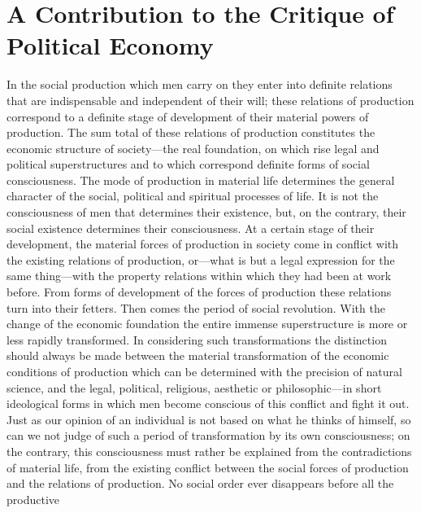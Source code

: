 
\author{Karl Marx}
\chapter[A Contribution to the Critique of Political Economy,\\
excerpt]{A Contribution to the Critique of Political Economy}


In the social production which men carry on they enter into
definite relations that are indispensable and independent of their
will; these relations of production correspond to a definite stage of
development of their material powers of production. The sum total of
these relations of production constitutes the economic structure of
society---the real foundation, on which rise legal and political
superstructures and to which correspond definite forms of social
consciousness. The mode of production in material life determines the
general character of the social, political and spiritual processes of
life. It is not the consciousness of men that determines their
existence, but, on the contrary, their social existence determines
 their consciousness. At a certain stage of their
development, the material forces of production in society come in
conflict with the existing relations of production, or---what is but a
legal expression for the same thing---with the property relations
within which they had been at work before. From forms of development
of the forces of production these relations turn into their fetters.
Then comes the period of social revolution. With the change of the
economic foundation the entire immense superstructure is more or less
rapidly transformed. In considering such transformations the
distinction should always be made between the material transformation
of the economic conditions of production which can be determined with
the precision of natural science, and the legal, political, religious,
aesthetic or philosophic---in short ideological forms in which men
become conscious of this conflict and fight it out. Just as our
opinion of an individual is not based on what he thinks of himself, so
can we not judge of such a period of transformation by its own
consciousness; on the contrary, this consciousness must rather be
explained from the contradictions of material life, from the existing
conflict between the social forces of production and the relations of
production. No social order ever disappears before all the productive

